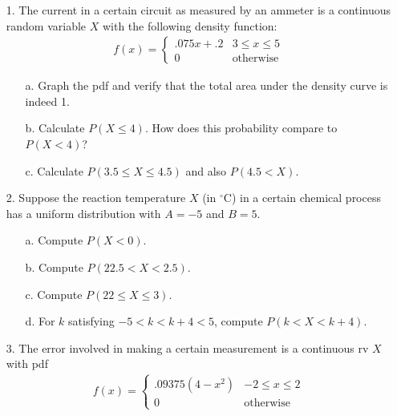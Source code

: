 \documentclass[letterpaper,12pt]{article}
\begin{document}
\maketitle

\begin{enumerate}
  \item[1.]
    The current in a certain circuit as measured by an ammeter is a continuous random variable $X$ with the following density function:
    \begin{align*}
      f(x) = \begin{cases}
        .075x + .2 & 3 \le x \le 5 \\
        0          & \text{otherwise}
      \end{cases}
    \end{align*}
    \begin{enumerate}
      \item[a.]
        Graph the pdf and verify that the total area under the density curve is indeed 1.
      \item[b.]
        Calculate $P(X \le 4)$. How does this probability compare to $P(X < 4)$?
      \item[c.]
        Calculate $P(3.5 \le X \le 4.5)$ and also $P(4.5 < X)$.
    \end{enumerate}
  \item[2.]
    Suppose the reaction temperature $X$ (in $^\circ$C) in a certain chemical process has a uniform distribution with $A = -5$ and $B = 5$.
    \begin{enumerate}
      \item[a.]
        Compute $P(X < 0)$.
      \item[b.]
        Compute $P(22.5 < X < 2.5)$.
      \item[c.]
        Compute $P(22 \le X \le 3)$.
      \item[d.]
        For $k$ satisfying $-5 < k < k + 4 < 5$, compute $P(k < X < k + 4)$.
    \end{enumerate}
  \item[3.]
    The error involved in making a certain measurement is a continuous rv $X$ with pdf
    \begin{align*}
      f(x) = \begin{cases}
        .09375(4 - x^2) & -2 \le x \le 2 \\
        0               & \text{otherwise}
      \end{cases}
    \end{align*}
    \begin{enumerate}

\end{enumerate}
\end{enumerate}
\end{document}
